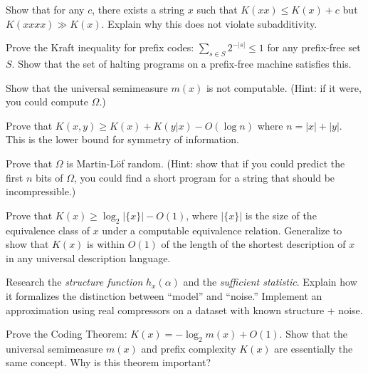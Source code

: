 \begin{exercise}[Intermediate]
Show that for any $c$, there exists a string $x$ such that $K(xx) \le K(x) + c$ but $K(xxxx) \gg K(x)$. Explain why this does not violate subadditivity.
\end{exercise}

\begin{exercise}[Intermediate]
Prove the Kraft inequality for prefix codes: $\sum_{s \in S} 2^{-|s|} \le 1$ for any prefix-free set $S$. Show that the set of halting programs on a prefix-free machine satisfies this.
\end{exercise}

\begin{exercise}[Intermediate]
Show that the universal semimeasure $m(x)$ is not computable. (Hint: if it were, you could compute $\Omega$.)
\end{exercise}

\begin{exercise}[Intermediate]
Prove that $K(x,y) \ge K(x) + K(y|x) - O(\log n)$ where $n = |x| + |y|$. This is the lower bound for symmetry of information.
\end{exercise}

\begin{exercise}[Challenge]
Prove that $\Omega$ is Martin-L\"of random. (Hint: show that if you could predict the first $n$ bits of $\Omega$, you could find a short program for a string that should be incompressible.)
\end{exercise}

\begin{exercise}[Challenge]
Prove that $K(x) \ge \log_2 |\{x\}| - O(1)$, where $|\{x\}|$ is the size of the equivalence class of $x$ under a computable equivalence relation. Generalize to show that $K(x)$ is within $O(1)$ of the length of the shortest description of $x$ in any universal description language.
\end{exercise}

\begin{exercise}[Challenge]
Research the \emph{structure function} $h_x(\alpha)$ and the \emph{sufficient statistic}. Explain how it formalizes the distinction between ``model'' and ``noise.'' Implement an approximation using real compressors on a dataset with known structure + noise.
\end{exercise}

\begin{exercise}[Challenge]
Prove the Coding Theorem: $K(x) = -\log_2 m(x) + O(1)$. Show that the universal semimeasure $m(x)$ and prefix complexity $K(x)$ are essentially the same concept. Why is this theorem important?
\end{exercise}


